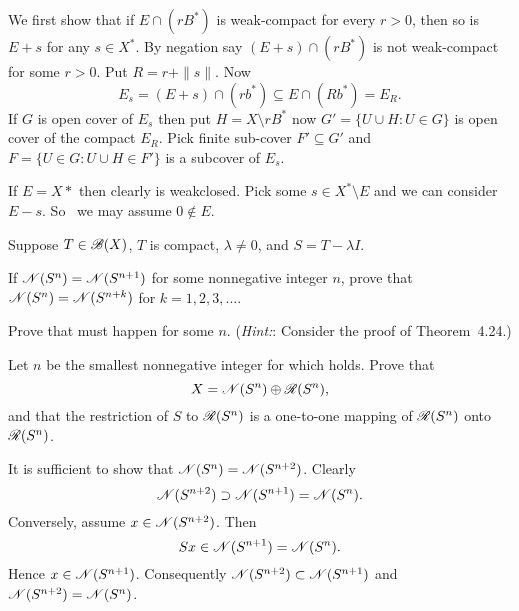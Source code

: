 \begin{enumerate}
\begin{itemize}
We first show that
if \(E\cap (rB^*)\) is weak\upstar-compact for every \(r > 0\),
then so is \(E + s\) for any \(s\in X^*\).
By negation say \((E + s) \cap (rB^*)\) is not weak\upstar-compact
for some \(r>0\).
Put \(R = r + \|s\|\). Now
\begin{equation*}
E_s = (E + s) \cap (rb^*) \subseteq E \cap (Rb^*) = E_R.
\end{equation*}
If $G$ is open cover of \(E_s\) then put \(H=X\setminus rB^*\)
now \(G'=\{U\cup H: U\in G\}\) is open cover of the compact \(E_R\).
Pick finite sub-cover \(F'\subseteq G'\) and
\(F = \{U\in G: U\cup H \in F'\}\) is a subcover of \(E_s\).

If \(E=X*\) then clearly is weak\upstar closed.
Pick some \(s\in X^* \setminus E\) and we can consider \(E-s\).
So \wlogy\ we may assume \(0\notin E\).

\unfinished

\end{itemize}

\unfinished

\begin{excopy}
Suppose \(T \in \mathscr{B}(X)\), $T$ is compact, \(\lambda \neq 0\),
 and \(S = T - \lambda I\).
\begin{itemize}

If \(\mathscr{N}(S^n) = \mathscr{N}(S^{n+1})\) for some  nonnegative integer $n$,
 prove that \(\mathscr{N}(S^n) = \mathscr{N}(S^{n+k})\)
for \(k=1,2,3,\ldots\).

Prove that  must happen for some $n$. 
(\emph{Hint:}: Consider the proof of Theorem~4.24.)

Let $n$ be the smallest nonnegative integer for which  holds.
 Prove that
\begin{equation*}
X = \mathscr{N}(S^n) \oplus \mathscr{R}(S^n),
\end{equation*}
and that the restriction of $S$ to \(\mathscr{R}(S^n)\) is a one-to-one mapping
 of \(\mathscr{R}(S^n)\) onto \(\mathscr{R}(S^n)\).

\end{itemize}

\end{excopy}

\begin{itemize}

It is sufficient to show that \(\mathscr{N}(S^n) = \mathscr{N}(S^{n+2})\).
Clearly 
\begin{equation*}
\mathscr{N}(S^{n+2}) \supset \mathscr{N}(S^{n+1}) = \mathscr{N}(S^n).
\end{equation*}
Conversely, assume \(x\in \mathscr{N}(S^{n+2})\). Then 
\begin{equation*}
Sx \in  \mathscr{N}(S^{n+1}) = \mathscr{N}(S^n).
\end{equation*}
Hence \(x \in \mathscr{N}(S^{n+1})\).
Consequently \(\mathscr{N}(S^{n+2}) \subset \mathscr{N}(S^{n+1})\)
and \(\mathscr{N}(S^{n+2}) = \mathscr{N}(S^n)\).


\end{itemize}
\end{enumerate}
